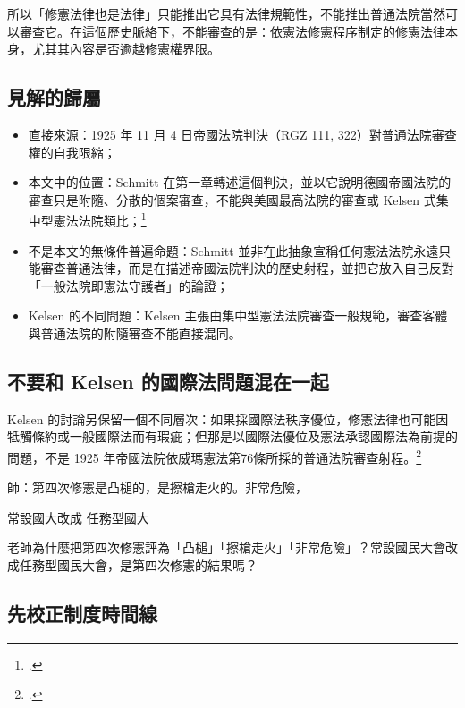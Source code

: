 所以「修憲法律也是法律」只能推出它具有法律規範性，不能推出普通法院當然可以審查它。在這個歷史脈絡下，不能審查的是：依憲法修憲程序制定的修憲法律本身，尤其其內容是否逾越修憲權界限。

\subsection{見解的歸屬}

\begin{itemize}
\tightlist
\item
  直接來源：1925 年 11 月 4 日帝國法院判決（RGZ 111, 322）對普通法院審查權的自我限縮；
\item
  本文中的位置：Schmitt 在第一章轉述這個判決，並以它說明德國帝國法院的審查只是附隨、分散的個案審查，不能與美國最高法院的審查或 Kelsen 式集中型憲法法院類比；\footcite[82--84, 86--90]{schmitt2015}
\item
  不是本文的無條件普遍命題：Schmitt 並非在此抽象宣稱任何憲法法院永遠只能審查普通法律，而是在描述帝國法院判決的歷史射程，並把它放入自己反對「一般法院即憲法守護者」的論證；
\item
  Kelsen 的不同問題：Kelsen 主張由集中型憲法法院審查一般規範，審查客體與普通法院的附隨審查不能直接混同。
\end{itemize}

\subsection{不要和 Kelsen 的國際法問題混在一起}

Kelsen 的討論另保留一個不同層次：如果採國際法秩序優位，修憲法律也可能因牴觸條約或一般國際法而有瑕疵；但那是以國際法優位及憲法承認國際法為前提的問題，不是 1925 年帝國法院依威瑪憲法第76條所採的普通法院審查射程。\footcites[57--59]{kelsen2015}[66--68]{kelsen1929}


\begin{qaprompt}
師：第四次修憲是凸槌的，是擦槍走火的。非常危險，

常設國大改成
任務型國大
\end{qaprompt}

\begin{qaquestion}
老師為什麼把第四次修憲評為「凸槌」「擦槍走火」「非常危險」？常設國民大會改成任務型國民大會，是第四次修憲的結果嗎？
\end{qaquestion}

\subsection{先校正制度時間線}


